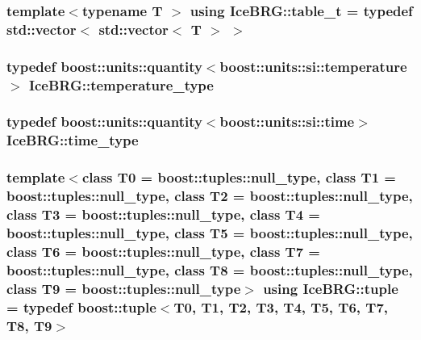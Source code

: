 \subsubsection[{table\+\_\+t}]{\setlength{\rightskip}{0pt plus 5cm}template$<$typename T $>$ using {\bf Ice\+B\+R\+G\+::table\+\_\+t} = typedef std\+::vector$<$ std\+::vector$<$ T $>$ $>$}\label{namespaceIceBRG_a59734b1a7b525d7d926f69a91bc8553b}
\hypertarget{namespaceIceBRG_afc3df702762e93c9a692609f0389d8d3}{}
\subsubsection[{temperature\+\_\+type}]{\setlength{\rightskip}{0pt plus 5cm}typedef boost\+::units\+::quantity$<$boost\+::units\+::si\+::temperature$>$ {\bf Ice\+B\+R\+G\+::temperature\+\_\+type}}\label{namespaceIceBRG_afc3df702762e93c9a692609f0389d8d3}
\hypertarget{namespaceIceBRG_abf6c442a2e180ef52c5cefe18e47c327}{}
\subsubsection[{time\+\_\+type}]{\setlength{\rightskip}{0pt plus 5cm}typedef boost\+::units\+::quantity$<$boost\+::units\+::si\+::time$>$ {\bf Ice\+B\+R\+G\+::time\+\_\+type}}\label{namespaceIceBRG_abf6c442a2e180ef52c5cefe18e47c327}
\hypertarget{namespaceIceBRG_a5148ef56bdd96f27ce60555b6aaa979e}{}
\subsubsection[{tuple}]{\setlength{\rightskip}{0pt plus 5cm}template$<$class T0  = boost\+::tuples\+::null\+\_\+type, class T1  = boost\+::tuples\+::null\+\_\+type, class T2  = boost\+::tuples\+::null\+\_\+type, class T3  = boost\+::tuples\+::null\+\_\+type, class T4  = boost\+::tuples\+::null\+\_\+type, class T5  = boost\+::tuples\+::null\+\_\+type, class T6  = boost\+::tuples\+::null\+\_\+type, class T7  = boost\+::tuples\+::null\+\_\+type, class T8  = boost\+::tuples\+::null\+\_\+type, class T9  = boost\+::tuples\+::null\+\_\+type$>$ using {\bf Ice\+B\+R\+G\+::tuple} = typedef boost\+::tuple$<$T0, T1, T2, T3, T4, T5, T6, T7, T8, T9$>$}\label{namespaceIceBRG_a5148ef56bdd96f27ce60555b6aaa979e}
\hypertarget{namespaceIceBRG_a7dff9bcf80d56e9e3fc9d9e25c89ae68}{}
